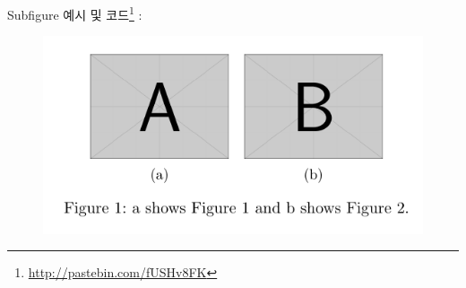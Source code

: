 \documentclass[12pt]{beamer}
\begin{document}
\begin{frame}[fragile]{Subfigure}
	예시 및 코드\footnote{\url{http://pastebin.com/fUSHv8FK}} : 
	\begin{figure}
		\centering
		\includegraphics[width=.8\textwidth]{subfigure.pdf}
	\end{figure}
\end{frame}
\end{document}
